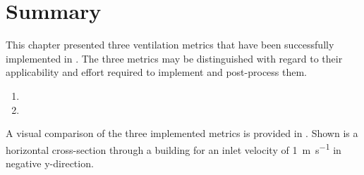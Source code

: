 \section{Summary}
\enlargethispage*{2cm}
This chapter presented three ventilation metrics that have been successfully implemented in \OF. 
The three metrics may be distinguished with regard to their applicability and effort required to implement and post-process them.

\begin{enumerate}
	\item \blindtext[1]	
	
	
	
	\item \blindtext[1]	
	
	
\end{enumerate}
\enlargethispage*{2cm}
A visual comparison of the three implemented metrics is provided in . Shown is a horizontal cross-section through a building for an inlet velocity of \SI{1}{\metre\per\second} in negative y-direction.

